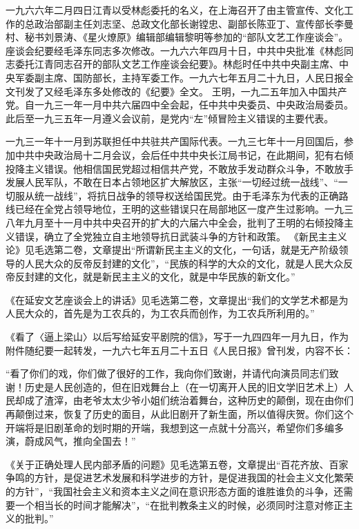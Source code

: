 \begin{maonote}
一九六六年二月四日江青以受林彪委托的名义，在上海召开了由主管宣传、文化工作的总政治部副主任刘志坚、总政文化部长谢镗忠、副部长陈亚丁、宣传部长李曼村、秘书刘景涛、《星火燎原》编辑部编辑黎明等参加的“部队文艺工作座谈会”。座谈会纪要经毛泽东同志多次修改。一九六六年四月十日，中共中央批准《林彪同志委托江青同志召开的部队文艺工作座谈会纪要》。林彪时任中共中央副主席、中央军委副主席、国防部长，主持军委工作。一九六七年五月二十九日，人民日报全文刊发了又经毛泽东多处修改的《纪要》全文。
王明，一九二五年加入中国共产党。自一九三一年一月中共六届四中全会起，任中共中央委员、中央政治局委员。此后至一九三五年一月遵义会议前，是党内“左”倾冒险主义错误的主要代表。

一九三一年十一月到苏联担任中共驻共产国际代表。一九三七年十一月回国后，参加中共中央政治局十二月会议，会后任中共中央长江局书记，在此期间，犯有右倾投降主义错误。他相信国民党超过相信共产党，不敢放手发动群众斗争，不敢放手发展人民军队，不敢在日本占领地区扩大解放区，主张“一切经过统一战线”、“一切服从统一战线”，将抗日战争的领导权送给国民党。由于毛泽东为代表的正确路线已经在全党占领导地位，王明的这些错误只在局部地区一度产生过影响。一九三八年九月至十一月中共中央召开的扩大的六届六中全会，批判了王明的右倾投降主义错误，确立了全党独立自主地领导抗日武装斗争的方针和政策。
《新民主主义论》见毛选第二卷，文章提出“所谓新民主主义的文化，一句话，就是无产阶级领导的人民大众的反帝反封建的文化”，“民族的科学的大众的文化，就是人民大众反帝反封建的文化，就是新民主主义的文化，就是中华民族的新文化。”

《在延安文艺座谈会上的讲话》见毛选第二卷，文章提出“我们的文学艺术都是为人民大众的，首先是为工农兵的，为工农兵而创作，为工农兵所利用的。”

《看了〈逼上梁山〉以后写给延安平剧院的信》，写于一九四四年一月九日，作为附件随纪要一起转发，一九六七年五月二十五日《人民日报》曾刊发，内容不长：

“看了你们的戏，你们做了很好的工作，我向你们致谢，并请代向演员同志们致谢！历史是人民创造的，但在旧戏舞台上（在一切离开人民的旧文学旧艺术上）人民却成了渣滓，由老爷太太少爷小姐们统治着舞台，这种历史的颠倒，现在由你们再颠倒过来，恢复了历史的面目，从此旧剧开了新生面，所以值得庆贺。你们这个开端将是旧剧革命的划时期的开端，我想到这一点就十分高兴，希望你们多编多演，蔚成风气，推向全国去！”

《关于正确处理人民内部矛盾的问题》见毛选第五卷，文章提出“百花齐放、百家争鸣的方针，是促进艺术发展和科学进步的方针，是促进我国的社会主义文化繁荣的方针”，“我国社会主义和资本主义之间在意识形态方面的谁胜谁负的斗争，还需要一个相当长的时间才能解决”，“在批判教条主义的时候，必须同时注意对修正主义的批判。”


\end{maonote}

